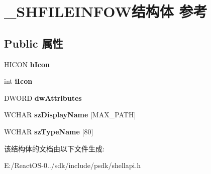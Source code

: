 \hypertarget{struct___s_h_f_i_l_e_i_n_f_o_w}{}\section{\+\_\+\+S\+H\+F\+I\+L\+E\+I\+N\+F\+O\+W结构体 参考}
\label{struct___s_h_f_i_l_e_i_n_f_o_w}
\subsection*{Public 属性}
\begin{DoxyCompactItemize}
\item 
\mbox{\label{struct___s_h_f_i_l_e_i_n_f_o_w_af606e5bca94613a2a07e849e38f318b3}} 
H\+I\+C\+ON {\bfseries h\+Icon}
\item 
\mbox{\label{struct___s_h_f_i_l_e_i_n_f_o_w_ac35aecbe583a4a941f08bd805fa696f4}} 
int {\bfseries i\+Icon}
\item 
\mbox{\label{struct___s_h_f_i_l_e_i_n_f_o_w_a9d6f31517a70eff1873012d9d358c38a}} 
D\+W\+O\+RD {\bfseries dw\+Attributes}
\item 
\mbox{\label{struct___s_h_f_i_l_e_i_n_f_o_w_ab1a12b95926963a74a612e17a812112d}} 
W\+C\+H\+AR {\bfseries sz\+Display\+Name} \mbox{[}M\+A\+X\+\_\+\+P\+A\+TH\mbox{]}
\item 
\mbox{\label{struct___s_h_f_i_l_e_i_n_f_o_w_a371a6183b600c75454d458ae320caeb6}} 
W\+C\+H\+AR {\bfseries sz\+Type\+Name} \mbox{[}80\mbox{]}
\end{DoxyCompactItemize}


该结构体的文档由以下文件生成\+:\begin{DoxyCompactItemize}
\item 
E\+:/\+React\+O\+S-\/0../sdk/include/psdk/shellapi.\+h\end{DoxyCompactItemize}
